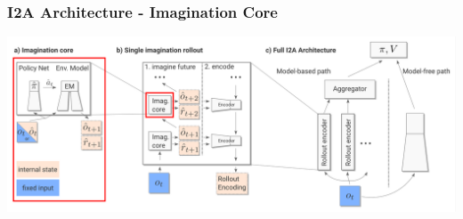 \begin{frame}
    \frametitle{I2A Architecture - Imagination Core}


\includegraphics[width=\columnwidth]{./Images/i2a_all_imagination_core.png}%

    
\end{frame}
\clearpage


